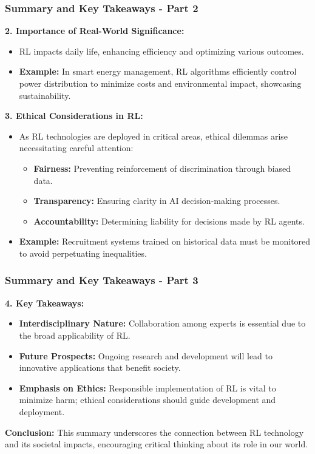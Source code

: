 \documentclass[aspectratio=169]{beamer}
\begin{document}
\begin{frame}[fragile]
  \frametitle{Summary and Key Takeaways - Part 2}
  
  \textbf{2. Importance of Real-World Significance:}
  \begin{itemize}
      \item RL impacts daily life, enhancing efficiency and optimizing various outcomes.
      \item \textbf{Example:} In smart energy management, RL algorithms efficiently control power distribution to minimize costs and environmental impact, showcasing sustainability.
  \end{itemize}
  
  \textbf{3. Ethical Considerations in RL:}
  \begin{itemize}
      \item As RL technologies are deployed in critical areas, ethical dilemmas arise necessitating careful attention:
      \begin{itemize}
          \item \textbf{Fairness:} Preventing reinforcement of discrimination through biased data.
          \item \textbf{Transparency:} Ensuring clarity in AI decision-making processes.
          \item \textbf{Accountability:} Determining liability for decisions made by RL agents.
      \end{itemize}
      \item \textbf{Example:} Recruitment systems trained on historical data must be monitored to avoid perpetuating inequalities.
  \end{itemize}
\end{frame}

\begin{frame}[fragile]
  \frametitle{Summary and Key Takeaways - Part 3}
  
  \textbf{4. Key Takeaways:}
  \begin{itemize}
      \item \textbf{Interdisciplinary Nature:} Collaboration among experts is essential due to the broad applicability of RL.
      \item \textbf{Future Prospects:} Ongoing research and development will lead to innovative applications that benefit society.
      \item \textbf{Emphasis on Ethics:} Responsible implementation of RL is vital to minimize harm; ethical considerations should guide development and deployment.
  \end{itemize}
  
  \textbf{Conclusion:} 
  This summary underscores the connection between RL technology and its societal impacts, encouraging critical thinking about its role in our world.
\end{frame}
\end{document}

